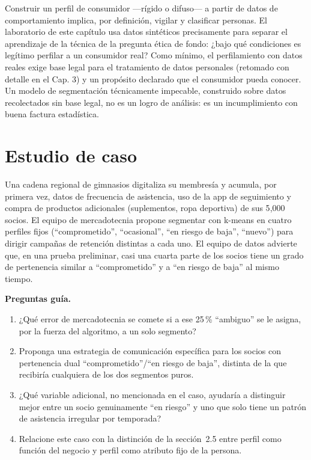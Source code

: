 \begin{cajaEtica}
Construir un perfil de consumidor —rígido o difuso— a partir de datos de
comportamiento implica, por definición, vigilar y clasificar personas. El
laboratorio de este capítulo usa datos sintéticos precisamente para separar
el aprendizaje de la técnica de la pregunta ética de fondo: ¿bajo qué
condiciones es legítimo perfilar a un consumidor real? Como mínimo, el
perfilamiento con datos reales exige base legal para el tratamiento de
datos personales (retomado con detalle en el Cap. 3) y un propósito
declarado que el consumidor pueda conocer. Un modelo de segmentación
técnicamente impecable, construido sobre datos recolectados sin base legal,
no es un logro de análisis: es un incumplimiento con buena factura
estadística.
\end{cajaEtica}

\section{Estudio de caso}

\begin{casoFicticio}
Una cadena regional de gimnasios digitaliza su membresía y acumula, por
primera vez, datos de frecuencia de asistencia, uso de la app de
seguimiento y compra de productos adicionales (suplementos, ropa deportiva)
de sus 5{,}000 socios. El equipo de mercadotecnia propone segmentar con
k-means en cuatro perfiles fijos (\enquote{comprometido}, \enquote{ocasional},
\enquote{en riesgo de baja}, \enquote{nuevo}) para dirigir campañas de retención
distintas a cada uno. El equipo de datos advierte que, en una prueba
preliminar, casi una cuarta parte de los socios tiene un grado de
pertenencia similar a \enquote{comprometido} y a \enquote{en riesgo de baja} al
mismo tiempo.

\textbf{Preguntas guía.}
\begin{enumerate}
  \item ¿Qué error de mercadotecnia se comete si a ese 25\,\% \enquote{ambiguo}
  se le asigna, por la fuerza del algoritmo, a un solo segmento?
  \item Proponga una estrategia de comunicación específica para los socios
  con pertenencia dual \enquote{comprometido}/\enquote{en riesgo de baja}, distinta
  de la que recibiría cualquiera de los dos segmentos puros.
  \item ¿Qué variable adicional, no mencionada en el caso, ayudaría a
  distinguir mejor entre un socio genuinamente \enquote{en riesgo} y uno que
  solo tiene un patrón de asistencia irregular por temporada?
  \item Relacione este caso con la distinción de la sección~2.5 entre perfil
  como función del negocio y perfil como atributo fijo de la persona.
\end{enumerate}
\end{casoFicticio}

